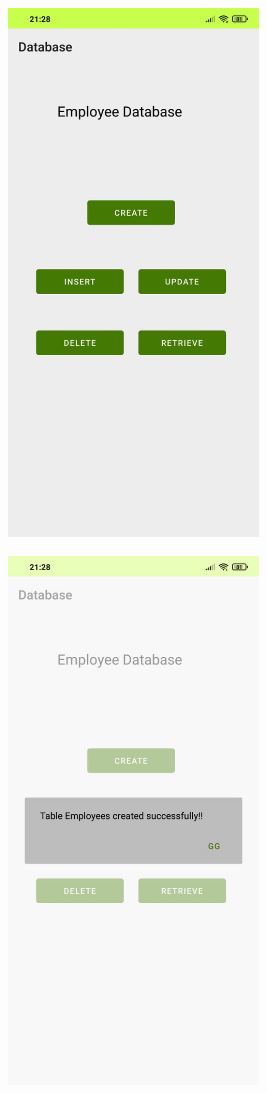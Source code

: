 \documentclass[12pt,letterpaper]{article}
\begin{document}
\subsubsection*{}
\begin{figure}[h]
    \centering
    \includegraphics[height=14cm, keepaspectratio]{Outputs/OP1.png}
\end{figure}
\begin{figure}
    \centering
    \includegraphics[height=14cm, keepaspectratio]{Outputs/OP2.png}
\end{figure}
\end{document}
